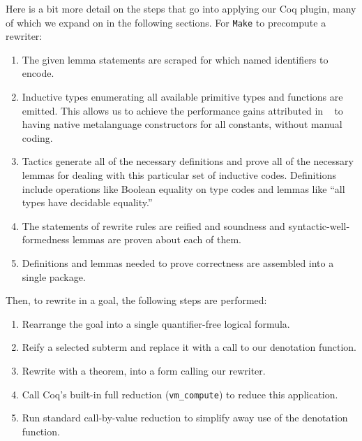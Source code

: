 \documentclass[a4paper,USenglish,cleveref,autoref,thm-restate]{lipics-v2021}
\newcommand{\citet}[1]{\usebibentry{#1}{citet}~\cite{#1}}
\newcommand{\todo}[1]{\textcolor{red}{\textbf{TODO: #1}}}
\newcommand{\tacvmcompute}{\texttt{vm_compute}}
\begin{document}
Here is a bit more detail on the steps that go into applying our Coq plugin, many of which we expand on in the following sections.
For \texttt{Make} to precompute a rewriter:
\begin{enumerate}
\item
  The given lemma statements are scraped for which named identifiers to encode.
\item
  Inductive types enumerating all available primitive types and functions are emitted.
  This allows us to achieve the performance gains attributed in \citet{Boespflug2009} to having native metalanguage constructors for all constants, without manual coding.
\item
  Tactics generate all of the necessary definitions and prove all of the necessary lemmas for dealing with this particular set of inductive codes.
  Definitions include operations like Boolean equality on type codes and lemmas like ``all types have decidable equality.''
\item
  The statements of rewrite rules are reified and soundness and syntactic-well-formedness lemmas are proven about each of them.
\item
  Definitions and lemmas needed to prove correctness are assembled into a single package.
\end{enumerate}

Then, to rewrite in a goal, the following steps are performed:
\begin{enumerate}
\item
  Rearrange the goal into a single quantifier-free logical formula.%
\item
  Reify a selected subterm and replace it with a call to our denotation function.
\item
  Rewrite with a theorem, into a form calling our rewriter.
\item Call Coq's built-in full reduction (\tacvmcompute{}) to reduce this application.
\item
  Run standard call-by-value reduction to simplify away use of the denotation function. %
\end{enumerate}
\end{document}
